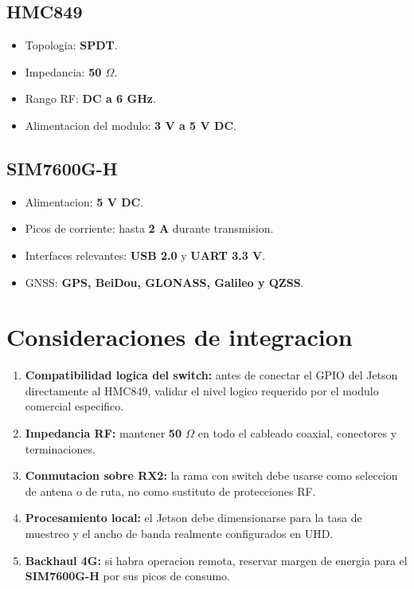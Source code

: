 \documentclass[11pt]{article}
\begin{document}
\subsection{HMC849}

\begin{itemize}[leftmargin=*]
    \item Topologia: \textbf{SPDT}.
    \item Impedancia: \textbf{50 $\Omega$}.
    \item Rango RF: \textbf{DC a 6 GHz}.
    \item Alimentacion del modulo: \textbf{3 V a 5 V DC}.
\end{itemize}

\subsection{SIM7600G-H}

\begin{itemize}[leftmargin=*]
    \item Alimentacion: \textbf{5 V DC}.
    \item Picos de corriente: hasta \textbf{2 A} durante transmision.
    \item Interfaces relevantes: \textbf{USB 2.0} y \textbf{UART 3.3 V}.
    \item GNSS: \textbf{GPS, BeiDou, GLONASS, Galileo y QZSS}.
\end{itemize}

\section{Consideraciones de integracion}

\begin{enumerate}[leftmargin=*]
    \item \textbf{Compatibilidad logica del switch:} antes de conectar el GPIO del Jetson directamente al HMC849, validar el nivel logico requerido por el modulo comercial especifico.
    \item \textbf{Impedancia RF:} mantener \textbf{50 $\Omega$} en todo el cableado coaxial, conectores y terminaciones.
    \item \textbf{Conmutacion sobre RX2:} la rama con switch debe usarse como seleccion de antena o de ruta, no como sustituto de protecciones RF.
    \item \textbf{Procesamiento local:} el Jetson debe dimensionarse para la tasa de muestreo y el ancho de banda realmente configurados en UHD.
    \item \textbf{Backhaul 4G:} si habra operacion remota, reservar margen de energia para el \textbf{SIM7600G-H} por sus picos de consumo.
\end{enumerate}
\end{document}
